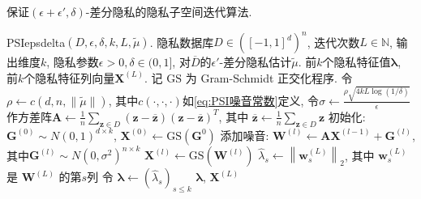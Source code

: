 \begin{algorithm}[hbtp]
	\caption{保证$(\epsilon + \epsilon', \delta)$-差分隐私的隐私子空间迭代算法\parencite{hardt2013robust}.}\label{alg:保证epsilon,delta差分隐私的子空间迭代算法}
	\begin{algorithmic}[1]
    \INTERFACE PSIepsdelta$(D, \epsilon, \delta, k, L, \tilde{\mu})$.
		\REQUIRE 隐私数据库$D \in([-1,1]^d)^n$, 迭代次数$L\in \mathbb{N}$, 输出维度$k$, 隐私参数$\epsilon > 0,  \delta\in(0, 1]$, 对$\overline{D}$的$\epsilon'$-差分隐私估计$\tilde{\mu}$.
		\ENSURE 前$k$个隐私特征值$\boldsymbol\lambda$, 前$k$个隐私特征列向量$\mathbf{X}^{(L)}$.
		\NOTATION 记 $\mathrm{GS}$ 为 Gram-Schmidt 正交化程序.
    \STATE 令$\rho \leftarrow c(d, n, \|\tilde{\mu}\|)$, 其中$c(\cdot, \cdot, \cdot)$如\eqref{eq:PSI噪音常数}定义, 令$\sigma\leftarrow \frac{\rho\sqrt{4kL\log(1/\delta)}}{\epsilon}$ 
    \STATE 作方差阵$\mathbf{A}\leftarrow\frac{1}{n}\sum_{\mathbf{z}\in D} (\mathbf{z}-\overline{\mathbf{z}})(\mathbf{z}-\overline{\mathbf{z}})^T$, 其中 $\overline{\mathbf{z}}\leftarrow\frac{1}{n}\sum_{\mathbf{z}\in D} \mathbf{z}$ \label{alg:line:PSI_参数设定}
		\STATE 初始化: $\mathbf{G}^{(0)}\sim N(0,1)^{d\times k}$, $\mathbf{X}^{(0)}\leftarrow \mathrm{GS}(\mathbf{G}^{0})$
		 \label{alg:line:PSI添加噪音前}
			\STATE 添加噪音: $\mathbf{W}^{(l)} \leftarrow \mathbf{A}\mathbf{X}^{(l-1)}+\mathbf{G}^{(l)}$, 其中$\mathbf{G}^{(l)}\sim N(0, \sigma^2)^{n\times k}$ \label{alg:line:PSI:添加噪音}
			\STATE $\mathbf{X}^{(l)} \leftarrow \mathrm{GS}\left(\mathbf{W}^{(l)}\right)$ \label{alg:line:PSI:添加噪音后}
		\ENDFOR
		  \STATE $\hat{\lambda}_s \leftarrow \left\|\mathbf{w}_s^{(L)}\right\|_2$, 其中 $\mathbf{w}_s^{(L)}$ 是 $\mathbf{W}^{(L)}$ 的第$s$列
    \ENDFOR
    \STATE 令 $\boldsymbol\lambda \leftarrow \left(\hat{\lambda}_s\right)_{s \le k}$ \label{alg:line:PSI:返回结果前}
    \RETURN $\boldsymbol\lambda$, $\mathbf{X}^{(L)}$
	\end{algorithmic}
\end{algorithm}
